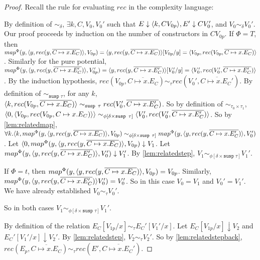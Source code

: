 \begin{proof}
  Recall the rule for evaluating $rec$ in the complexity language:
  \begin{prooftree}
  \end{prooftree}
  \begin{sloppypar}
  By definition of $\sim_\delta$, $\exists k, C, V_0, V_0'$ such that $E \downarrow \LP k, C V_{0p} \RP, E' \downarrow C V_0'$, and $V_0 \sim_\delta V_0'$.
  Our proof proceeds by induction on the number of constructors in $C V_{0p}$.
  If $\Phi = T$, then $map^\Phi(y, \LP y, rec(y, \overline{C \mapsto x.E_C})\RP, V_{0p}) = \LP y, rec(y, \overline{C \mapsto x.E_C})\RP[V_{0p}/y] = \LP V_{0p}, rec(V_{0p}, \overline{C \mapsto x.E_C}) \RP$.
  Similarly for the pure potential, $map^\Phi(y, \LP y, rec(y, \overline{C \mapsto x.E_C'})\RP, V_{0p}') = \LP y, rec(y, \overline{C \mapsto x.E_C'})\RP [V_0'/y] = \LP V_0', rec(V_0', \overline{C \mapsto x.E_C'}) \RP$.
  By the induction hypothesis, $rec(V_{0p}, \overline{C \mapsto x.E_C}) \sim_\tau rec(V_0', \overline{C \mapsto x.E_C'})$.
  By definition of $\sim_{\texttt{susp }\tau}$, for any $k$, $\LP k, rec(V_{0p}, \overline{C \mapsto x.E_C}) \RP \sim_{\texttt{susp }\tau} rec(V_0', \overline{C \mapsto x.E_C'})$.
  So by definition of $\sim_{\tau_0 \times \tau_1}$, $\LP 0, \LP V_{0p}, rec(V_{0p}, C \mapsto x.E_C) \RP\RP \sim_{\phi[\delta \times \texttt{susp }\tau]} \LP V_0', rec(V_0', \overline{C \mapsto x.E_C'})\RP$.
  So by \ref{lem:relatedmap}, $\forall k. \LP k, map^\Phi(y, \LP y, rec(y, \overline{C \mapsto x.E_C})\RP, V_{0p}) \sim_{\phi[\delta \times \texttt{susp }\tau]} map^\Phi(y, \LP y, rec(y, \overline{C \mapsto x.E_C'}) \RP, V_0')$.
  Let $\LP 0, map^\Phi(y, \LP y, rec(y, \overline{C \mapsto x.E_C})\RP, V_{0p}) \downarrow V_1$.
  Let $map^\Phi(y, \LP y, rec(y, \overline{C \mapsto x.E_C'}) \RP, V_0') \downarrow V_1'$.
  By \ref{lem:relatedstep}, $V_1 \sim_{\phi[\delta \times \texttt{susp }\tau]} V_1'$.
  \end{sloppypar}

  If $\Phi = t$, then $map^\Phi(y, \LP y, rec(y, \overline{C \mapsto x.E_C})\RP, V_{0p}) = V_{0p}$.
  Similarly, $map^\Phi(y, \LP y, rec(y, \overline{C \mapsto x.E_C'})\RP V_0') = V_0'$.
  So in this case $V_0 = V_1$ and $V_0' = V_1'$.
  We have already established $V_0 \sim_\tau V_0'$.

  So in both cases $V_1 \sim_{\phi[\delta \times \texttt{susp }\tau]} V_1'$.

  By definition of the relation $E_C[V_{1p}/x] \sim_\tau E_C'[V_1'/x]$.
  Let $E_C[V_{1p}/x] \downarrow V_2$ and $E_C'[V_1'/x] \downarrow V_2'$.
  By \ref{lem:relatedstep}, $V_2 \sim_\tau V_2'$.
  So by \ref{lem:relatedstepback}, $rec(E_p, \overline{C \mapsto x.E_C}) \sim_\tau rec(E', \overline{C \mapsto x.E_C'})$.
\end{proof}

